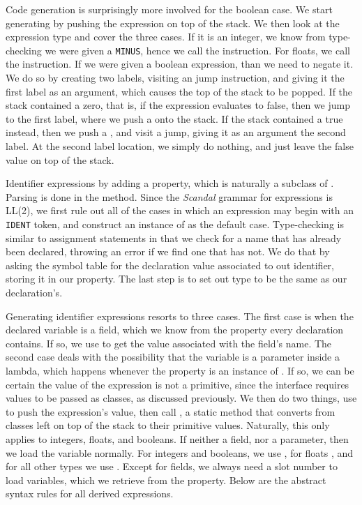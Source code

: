 Code generation is surprisingly more involved for the boolean case. We start generating by pushing the expression on top of the stack. We then look at the expression type and cover the three cases. If it is an integer, we know from type-checking we were given a \texttt{MINUS}, hence we call the  instruction. For floats, we call the  instruction. If we were given a boolean expression, than we need to negate it. We do so by creating two labels, visiting an  jump instruction, and giving it the first label as an argument, which causes the top of the stack to be popped. If the stack contained a zero, that is, if the expression evaluates to false, then we jump to the first label, where we push a  onto the stack. If the stack contained a true instead, then we push a , and visit a  jump, giving it as an argument the second label. At the second label location, we simply do nothing, and just leave the false value on top of the stack.

Identifier expressions by adding a  property, which is naturally a subclass of . Parsing is done in the  method. Since the \emph{Scandal} grammar for expressions is LL(2), we first rule out all of the cases in which an expression may begin with an \texttt{IDENT} token, and construct an instance of  as the default case. Type-checking is similar to assignment statements in that we check for a name that has already been declared, throwing an error if we find one that has not. We do that by asking the symbol table for the declaration value associated to out identifier, storing it in our  property. The last step is to set out type to be the same as our declaration's.

Generating identifier expressions resorts to three cases. The first case is when the declared variable is a field, which we know from the  property every declaration contains. If so, we use  to get the value associated with the field's name. The second case deals with the possibility that the variable is a parameter inside a lambda, which happens whenever the  property is an instance of . If so, we can be certain the value of the expression is not a primitive, since the  interface requires values to be passed as classes, as discussed previously. We then do two things, use  to push the expression's value, then call , a static method that converts from classes left on top of the stack to their primitive values. Naturally, this only applies to integers, floats, and booleans. If neither a field, nor a parameter, then we load the variable normally. For integers and booleans, we use , for floats , and for all other types we use . Except for fields, we always need a slot number to load variables, which we retrieve from the  property. Below are the abstract syntax rules for all derived expressions.

